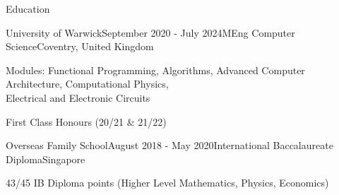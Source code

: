 \documentclass{resume}
\begin{document}
    \begin{rSection}{Education}
        \begin{rSubsection}{University of Warwick}{September 2020 - July 2024}{MEng Computer Science}{Coventry, United Kingdom}{}
        \item Modules: Functional Programming, Algorithms, Advanced Computer Architecture, Computational Physics, \\Electrical and Electronic Circuits
        \item First Class Honours (20/21 \& 21/22)
        \end{rSubsection}
        \begin{rSubsection}{Overseas Family School}{August 2018 - May 2020}{International Baccalaureate Diploma}{Singapore}{}
        \item 43/45 IB Diploma points (Higher Level Mathematics, Physics, Economics)
        \end{rSubsection}
    \end{rSection}
\end{document}
